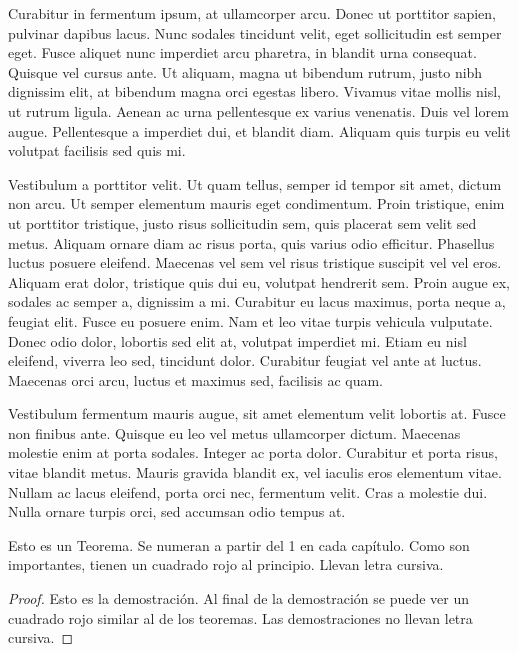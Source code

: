 Curabitur in fermentum ipsum, at ullamcorper arcu. Donec ut porttitor sapien, pulvinar dapibus lacus. Nunc sodales tincidunt velit, eget sollicitudin est semper eget. Fusce aliquet nunc imperdiet arcu pharetra, in blandit urna consequat. Quisque vel cursus ante. Ut aliquam, magna ut bibendum rutrum, justo nibh dignissim elit, at bibendum magna orci egestas libero. Vivamus vitae mollis nisl, ut rutrum ligula. Aenean ac urna pellentesque ex varius venenatis. Duis vel lorem augue. Pellentesque a imperdiet dui, et blandit diam. Aliquam quis turpis eu velit volutpat facilisis sed quis mi.

Vestibulum a porttitor velit. Ut quam tellus, semper id tempor sit amet, dictum non arcu. Ut semper elementum mauris eget condimentum. Proin tristique, enim ut porttitor tristique, justo risus sollicitudin sem, quis placerat sem velit sed metus. Aliquam ornare diam ac risus porta, quis varius odio efficitur. Phasellus luctus posuere eleifend. Maecenas vel sem vel risus tristique suscipit vel vel eros. Aliquam erat dolor, tristique quis dui eu, volutpat hendrerit sem. Proin augue ex, sodales ac semper a, dignissim a mi. Curabitur eu lacus maximus, porta neque a, feugiat elit. Fusce eu posuere enim. Nam et leo vitae turpis vehicula vulputate. Donec odio dolor, lobortis sed elit at, volutpat imperdiet mi. Etiam eu nisl eleifend, viverra leo sed, tincidunt dolor. Curabitur feugiat vel ante at luctus. Maecenas orci arcu, luctus et maximus sed, facilisis ac quam.

Vestibulum fermentum mauris augue, sit amet elementum velit lobortis at. Fusce non finibus ante. Quisque eu leo vel metus ullamcorper dictum. Maecenas molestie enim at porta sodales. Integer ac porta dolor. Curabitur et porta risus, vitae blandit metus. Mauris gravida blandit ex, vel iaculis eros elementum vitae. Nullam ac lacus eleifend, porta orci nec, fermentum velit. Cras a molestie dui. Nulla ornare turpis orci, sed accumsan odio tempus at.

\begin{theorem}[Euclides]\label{thm:th1}
    Esto es un Teorema. Se numeran a partir del 1 en cada capítulo. Como son importantes, tienen un cuadrado rojo al principio. Llevan letra cursiva.
\end{theorem}

\begin{proof}
    Esto es la demostración. Al final de la demostración se puede ver un cuadrado rojo similar al de los teoremas. Las demostraciones no llevan letra cursiva.
\end{proof}

